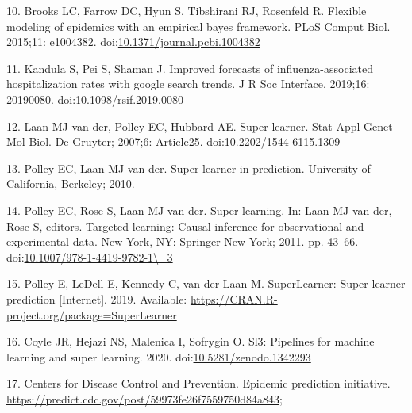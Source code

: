 \documentclass[10pt,letterpaper]{article}
\begin{document}
\leavevmode\hypertarget{ref-Brooks2015-fl}{}%
10. Brooks LC, Farrow DC, Hyun S, Tibshirani RJ, Rosenfeld R. Flexible
modeling of epidemics with an empirical bayes framework. PLoS Comput
Biol. 2015;11: e1004382.
doi:\href{https://doi.org/10.1371/journal.pcbi.1004382}{10.1371/journal.pcbi.1004382}

\leavevmode\hypertarget{ref-Kandula2019-tg}{}%
11. Kandula S, Pei S, Shaman J. Improved forecasts of
influenza-associated hospitalization rates with google search trends. J
R Soc Interface. 2019;16: 20190080.
doi:\href{https://doi.org/10.1098/rsif.2019.0080}{10.1098/rsif.2019.0080}

\leavevmode\hypertarget{ref-Van_der_Laan2007-ml}{}%
12. Laan MJ van der, Polley EC, Hubbard AE. Super learner. Stat Appl
Genet Mol Biol. De Gruyter; 2007;6: Article25.
doi:\href{https://doi.org/10.2202/1544-6115.1309}{10.2202/1544-6115.1309}

\leavevmode\hypertarget{ref-Polley2010-cb}{}%
13. Polley EC, Laan MJ van der. Super learner in prediction. University
of California, Berkeley; 2010.

\leavevmode\hypertarget{ref-Polley2011-oz}{}%
14. Polley EC, Rose S, Laan MJ van der. Super learning. In: Laan MJ van
der, Rose S, editors. Targeted learning: Causal inference for
observational and experimental data. New York, NY: Springer New York;
2011. pp. 43--66.
doi:\href{https://doi.org/10.1007/978-1-4419-9782-1/_3}{10.1007/978-1-4419-9782-1\textbackslash{}\_3}

\leavevmode\hypertarget{ref-Polley2019-sl}{}%
15. Polley E, LeDell E, Kennedy C, van der Laan M. SuperLearner: Super
learner prediction {[}Internet{]}. 2019. Available:
\url{https://CRAN.R-project.org/package=SuperLearner}

\leavevmode\hypertarget{ref-Coyle2020-ze}{}%
16. Coyle JR, Hejazi NS, Malenica I, Sofrygin O. Sl3: Pipelines for
machine learning and super learning. 2020.
doi:\href{https://doi.org/10.5281/zenodo.1342293}{10.5281/zenodo.1342293}

\leavevmode\hypertarget{ref-Centers_for_Disease_Control_and_Prevention_undated-tx}{}%
17. Centers for Disease Control and Prevention. Epidemic prediction
initiative. \url{https://predict.cdc.gov/post/59973fe26f7559750d84a843};

\nolinenumbers
\end{document}
